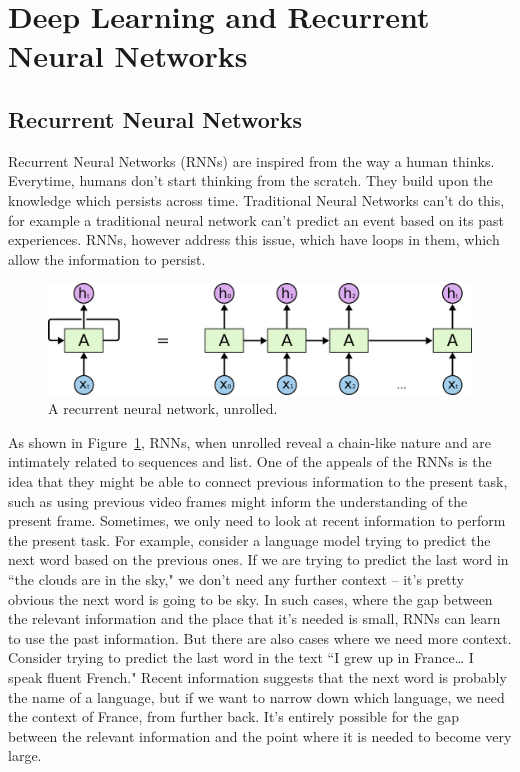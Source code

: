 \section{Deep Learning and Recurrent Neural Networks}
\label{sec:deep}

\subsection{Recurrent Neural Networks}
Recurrent Neural Networks (\textsc{RNN}s) are inspired from the way a human thinks. Everytime, humans don't start thinking from the scratch. They build upon the knowledge which persists across time. Traditional Neural Networks can't do this, for example a traditional neural network can't predict an event based on its past experiences. \textsc{RNN}s, however address this issue, which have loops in them, which allow the information to persist.

\begin{figure}[h]
\centering
\includegraphics[scale=0.4]{figures/RNN-unrolled.png}
\caption{A recurrent neural network, unrolled.~\cite{colahSite}}
\label{fig:unrollRNN}
\end{figure}


As shown in Figure~\ref{fig:unrollRNN}, \textsc{RNN}s, when unrolled reveal a chain-like nature and are intimately related to sequences and list. One of the appeals of the \textsc{RNN}s is the idea that they might be able to connect previous information to the present task, such as using previous video frames might inform the understanding of the present frame. Sometimes, we only need to look at recent information to perform the present task. For example, consider a language model trying to predict the next word based on the previous ones. If we are trying to predict the last word in ``the clouds are in the sky," we don’t need any further context – it’s pretty obvious the next word is going to be sky. In such cases, where the gap between the relevant information and the place that it’s needed is small, RNNs can learn to use the past information. But there are also cases where we need more context. Consider trying to predict the last word in the text ``I grew up in France… I speak fluent French." Recent information suggests that the next word is probably the name of a language, but if we want to narrow down which language, we need the context of France, from further back. It’s entirely possible for the gap between the relevant information and the point where it is needed to become very large.

